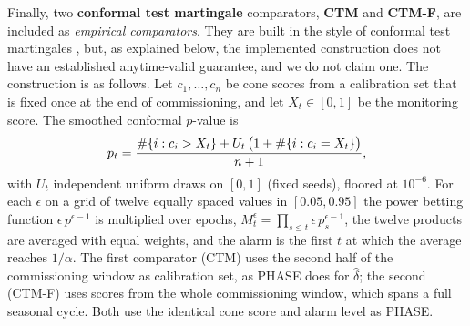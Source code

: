 \documentclass[12pt,a4paper]{article}
\newenvironment{revblock}{}{}
\newenvironment{revblock}{\begingroup\color{revcol}}{\endgroup}
\newcommand{\rtwo}[1]{#1}
\newcommand{\rtwo}[1]{{\color{revcolb}#1}}
\begin{document}
\begin{revblock}
\rtwo{Finally, two \textbf{conformal test martingale} comparators, \textbf{CTM} and \textbf{CTM-F}, are included as \emph{empirical comparators}.} \rtwo{They are built in the style of conformal test martingales \citep{vovk2021testing}, but, as explained below, the implemented construction does not have an established anytime-valid guarantee, and we do not claim one.} \rtwo{The construction is as follows.} \rtwo{Let $c_1,\dots,c_n$ be cone scores from a calibration set that is fixed once at the end of commissioning, and let $X_t\in[0,1]$ be the monitoring score.} \rtwo{The smoothed conformal $p$-value is}
\[
\color{revcolb} p_t=\frac{\#\{i:c_i>X_t\}+U_t\,\big(1+\#\{i:c_i=X_t\}\big)}{n+1},
\]
\rtwo{with $U_t$ independent uniform draws on $[0,1]$ (fixed seeds), floored at $10^{-6}$.} \rtwo{For each $\epsilon$ on a grid of twelve equally spaced values in $[0.05,0.95]$ the power betting function $\epsilon\,p^{\epsilon-1}$ is multiplied over epochs, $M^\epsilon_t=\prod_{s\le t}\epsilon\,p_s^{\epsilon-1}$, the twelve products are averaged with equal weights, and the alarm is the first $t$ at which the average reaches $1/\alpha$.} \rtwo{The first comparator (CTM) uses the second half of the commissioning window as calibration set, as PHASE does for $\hat\delta$; the second (CTM-F) uses scores from the whole commissioning window, which spans a full seasonal cycle.} \rtwo{Both use the identical cone score and alarm level as PHASE.}


\end{revblock}
\end{document}
